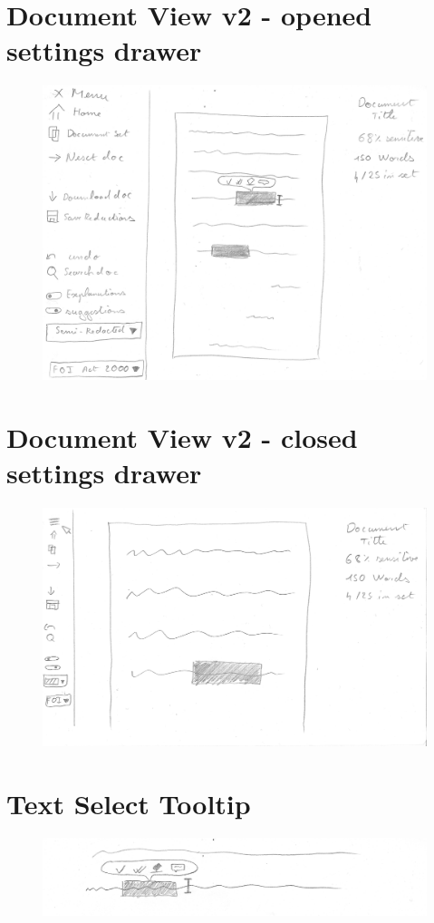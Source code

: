 \documentclass[\version]{l4proj}
\begin{document}
\begin{appendices}
    \section{Document View v2 - opened settings drawer}
    \begin{figure}[H]
        \centering
        \includegraphics[width=\linewidth]{images/wireframes/doc_view.jpg}
    \end{figure}
    \section{Document View v2 - closed settings drawer}
    \begin{figure}[H]
        \centering
        \includegraphics[width=\linewidth]{images/wireframes/doc-view.jpg}
    \end{figure}
    \section{Text Select Tooltip}
    \begin{figure}[H]
        \centering
        \includegraphics[width=\linewidth]{images/wireframes/tooltip.jpg}
    \end{figure}

\end{appendices}
\end{document}
